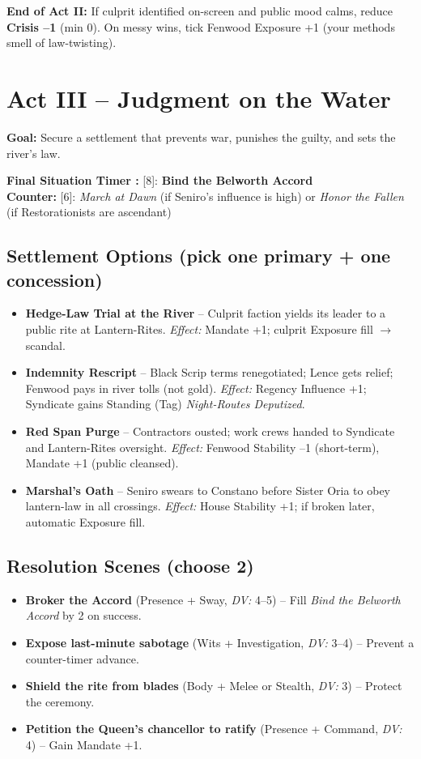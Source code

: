 \documentclass[11pt]{article}
\newcommand{\timer}[2]{\textbf{#1:} [#2]}
\newcommand{\dv}[1]{\textit{DV:} #1}
\begin{document}
\textbf{End of Act II:} If culprit identified on-screen and public mood calms, reduce \textbf{Crisis --1} (min 0). On messy wins, tick Fenwood Exposure +1 (your methods smell of law-twisting).

\section*{Act III -- Judgment on the Water}
\textbf{Goal:} Secure a settlement that prevents war, punishes the guilty, and sets the river's law.

\timer{Final Situation Timer }{8}: \textbf{Bind the Belworth Accord} \\
\timer{Counter}{6}: \textit{March at Dawn} (if Seniro's influence is high) or \textit{Honor the Fallen} (if Restorationists are ascendant)

\subsection*{Settlement Options (pick one primary + one concession)}
\begin{itemize}
  \item \textbf{Hedge-Law Trial at the River} -- Culprit faction yields its leader to a public rite at Lantern-Rites.  
    \textit{Effect:} Mandate +1; culprit Exposure fill $\rightarrow$ scandal.
  \item \textbf{Indemnity Rescript} -- Black Scrip terms renegotiated; Lence gets relief; Fenwood pays in river tolls (not gold).  
    \textit{Effect:} Regency Influence +1; Syndicate gains Standing (Tag) \textit{Night-Routes Deputized}.
  \item \textbf{Red Span Purge} -- Contractors ousted; work crews handed to Syndicate and Lantern-Rites oversight.  
    \textit{Effect:} Fenwood Stability --1 (short-term), Mandate +1 (public cleansed).
  \item \textbf{Marshal's Oath} -- Seniro swears to Constano before Sister Oria to obey lantern-law in all crossings.  
    \textit{Effect:} House Stability +1; if broken later, automatic Exposure fill.
\end{itemize}

\subsection*{Resolution Scenes (choose 2)}
\begin{itemize}
  \item \textbf{Broker the Accord} (Presence + Sway, \dv{4--5}) -- Fill \textit{Bind the Belworth Accord} by 2 on success.
  \item \textbf{Expose last-minute sabotage} (Wits + Investigation, \dv{3--4}) -- Prevent a counter-timer advance.
  \item \textbf{Shield the rite from blades} (Body + Melee or Stealth, \dv{3}) -- Protect the ceremony.
  \item \textbf{Petition the Queen's chancellor to ratify} (Presence + Command, \dv{4}) -- Gain Mandate +1.
\end{itemize}
\end{document}
